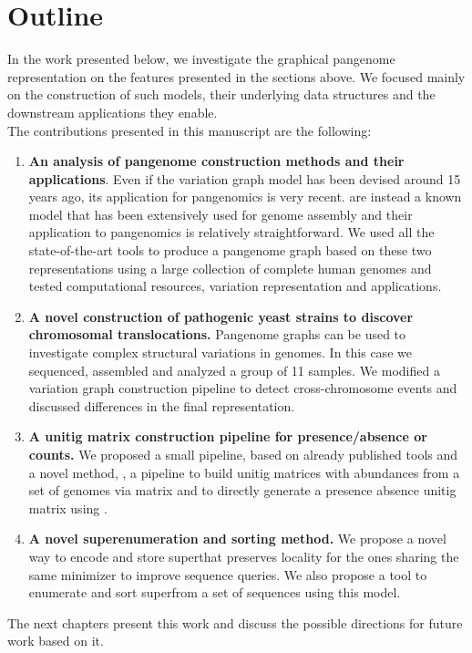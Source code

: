 \section{Outline}
In the work presented below, we investigate the graphical pangenome representation on the features presented in the sections above. We focused mainly on the construction of such models, their underlying data structures and the downstream applications they enable.\\
The contributions presented in this manuscript are the following:
\begin{enumerate}
	\item \textbf{An analysis of pangenome construction methods and their applications}. Even if the variation graph model has been devised around 15 years ago, its application for pangenomics is very recent. \dbgs are instead a known model that has been extensively used for genome assembly and their application to pangenomics is relatively straightforward. We used all the state-of-the-art tools to produce a pangenome graph based on these two representations using a large collection of complete human genomes and tested computational resources, variation representation and applications.
	\item  \textbf{A novel construction of pathogenic yeast strains to discover chromosomal translocations.} Pangenome graphs can be used to investigate complex structural variations in genomes. In this case we sequenced, assembled and analyzed a group of 11 samples. We modified a variation graph construction pipeline to detect cross-chromosome events and discussed differences in the final representation.
	\item \textbf{A unitig matrix construction pipeline for presence/absence or counts.} We proposed a small pipeline, based on already published tools and a novel method, \kmat, a pipeline to build unitig matrices with abundances from a set of genomes via \kmer matrix and to directly generate a presence absence unitig matrix using \ccdbgs. 
	\item  \textbf{A novel super\kmers enumeration and sorting method.} We propose a novel way to encode and store super\kmers that preserves locality for the ones sharing the same minimizer to improve sequence queries. We also propose a tool to enumerate and sort super\kmers from a set of sequences using this model.
\end{enumerate}

The next chapters present this work and discuss the possible directions for future work based on it.

\printbibliography